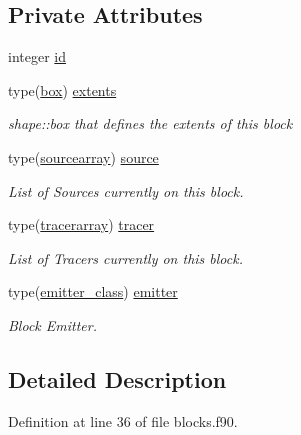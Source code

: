 \subsection*{Private Attributes}
\begin{DoxyCompactItemize}
\item 
integer \mbox{\hyperlink{structblocks__mod_1_1block__class_addd1a493d56aa1ffd1bc27c56b682065}{id}}
\item 
type(\mbox{\hyperlink{structgeometry__mod_1_1box}{box}}) \mbox{\hyperlink{structblocks__mod_1_1block__class_aff3b0cb7d8248f8a87691a028de916d3}{extents}}
\begin{DoxyCompactList}\small\item\em shape\+::box that defines the extents of this block \end{DoxyCompactList}\item 
type(\mbox{\hyperlink{structsources__array__mod_1_1sourcearray}{sourcearray}}) \mbox{\hyperlink{structblocks__mod_1_1block__class_a398a25c84b76ebe336c1384552bda602}{source}}
\begin{DoxyCompactList}\small\item\em List of Sources currently on this block. \end{DoxyCompactList}\item 
type(\mbox{\hyperlink{structtracer__array__mod_1_1tracerarray}{tracerarray}}) \mbox{\hyperlink{structblocks__mod_1_1block__class_ac1deffab20b882618041f0dcc0e58c22}{tracer}}
\begin{DoxyCompactList}\small\item\em List of Tracers currently on this block. \end{DoxyCompactList}\item 
type(\mbox{\hyperlink{structemitter__mod_1_1emitter__class}{emitter\+\_\+class}}) \mbox{\hyperlink{structblocks__mod_1_1block__class_a55e85183ba871abcaba1c00d5393611f}{emitter}}
\begin{DoxyCompactList}\small\item\em Block Emitter. \end{DoxyCompactList}\end{DoxyCompactItemize}


\subsection{Detailed Description}


Definition at line 36 of file blocks.\+f90.



